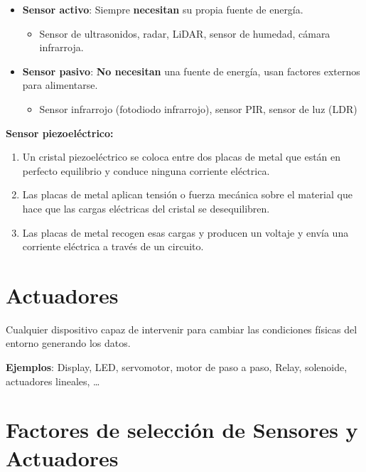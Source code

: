 \documentclass[12pt, twoside, openright]{report} %
\begin{document}
\begin{itemize}
	\item \textbf{Sensor activo}: Siempre \textbf{necesitan} su propia fuente de
	      energía.

	      \begin{itemize}
		      \item Sensor de ultrasonidos, radar, LiDAR, sensor de humedad, cámara
		            infrarroja.
	      \end{itemize}
	\item \textbf{Sensor pasivo}: \textbf{No necesitan} una fuente de energía,
	      usan factores externos para alimentarse.

	      \begin{itemize}
		      \item Sensor infrarrojo (fotodiodo infrarrojo), sensor PIR, sensor de luz
		            (LDR)
	      \end{itemize}
\end{itemize}

\textbf{Sensor piezoeléctrico:}

\begin{enumerate}
	\def\labelenumi{\arabic{enumi}.}
	\item Un cristal piezoeléctrico se coloca entre dos placas de metal que
	      están en perfecto equilibrio y conduce ninguna corriente eléctrica.
	\item Las placas de metal aplican tensión o fuerza mecánica sobre el
	      material que hace que las cargas eléctricas del cristal se
	      desequilibren.
	\item Las placas de metal recogen esas cargas y producen un voltaje y envía
	      una corriente eléctrica a través de un circuito.
\end{enumerate}

\section{Actuadores}

Cualquier dispositivo capaz de intervenir para cambiar las condiciones
físicas del entorno generando los datos.

\textbf{Ejemplos}: Display, LED, servomotor, motor de paso a paso,
Relay, solenoide, actuadores lineales, \ldots{}

\section{Factores de selección de Sensores y
  Actuadores}
\end{document}
